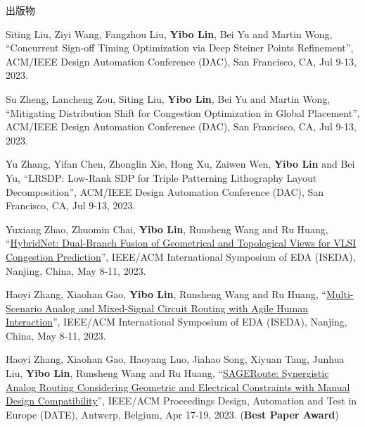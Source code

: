 \begin{rSection}{出版物}
\begin{description}[font=\normalfont, rightmargin=2em]
{}
            

\item[{[C79]}]{
        Siting Liu, Ziyi Wang, Fangzhou Liu, \textbf{Yibo Lin}, Bei Yu and Martin Wong, 
    ``Concurrent Sign-off Timing Optimization via Deep Steiner Points Refinement'', 
    ACM/IEEE Design Automation Conference (DAC), San Francisco, CA, Jul 9-13, 2023.
    
}
            

\item[{[C78]}]{
        Su Zheng, Lancheng Zou, Siting Liu, \textbf{Yibo Lin}, Bei Yu and Martin Wong, 
    ``Mitigating Distribution Shift for Congestion Optimization in Global Placement'', 
    ACM/IEEE Design Automation Conference (DAC), San Francisco, CA, Jul 9-13, 2023.
    
}
            

\item[{[C77]}]{
        Yu Zhang, Yifan Chen, Zhonglin Xie, Hong Xu, Zaiwen Wen, \textbf{Yibo Lin} and Bei Yu, 
    ``LRSDP: Low-Rank SDP for Triple Patterning Lithography Layout Decomposition'', 
    ACM/IEEE Design Automation Conference (DAC), San Francisco, CA, Jul 9-13, 2023.
    
}
            

\item[{[C76]}]{
        Yuxiang Zhao, Zhuomin Chai, \textbf{Yibo Lin}, Runsheng Wang and Ru Huang, 
    ``\href{https://arxiv.org/pdf/2305.05374.pdf}{HybridNet: Dual-Branch Fusion of Geometrical and Topological Views for VLSI Congestion Prediction}'', 
    IEEE/ACM International Symposium of EDA (ISEDA), Nanjing, China, May 8-11, 2023.
    
}
            

\item[{[C75]}]{
        Haoyi Zhang, Xiaohan Gao, \textbf{Yibo Lin}, Runsheng Wang and Ru Huang, 
    ``\href{https://doi.org/10.1109/ISEDA59274.2023.10218434}{Multi-Scenario Analog and Mixed-Signal Circuit Routing with Agile Human Interaction}'', 
    IEEE/ACM International Symposium of EDA (ISEDA), Nanjing, China, May 8-11, 2023.
    
}
            

\item[{[C74]}]{
        Haoyi Zhang, Xiaohan Gao, Haoyang Luo, Jiahao Song, Xiyuan Tang, Junhua Liu, \textbf{Yibo Lin}, Runsheng Wang and Ru Huang, 
    ``\href{https://doi.org/10.23919/DATE56975.2023.10137296}{SAGERoute: Synergistic Analog Routing Considering Geometric and Electrical Constraints with Manual Design Compatibility}'', 
    IEEE/ACM Proceedings Design, Automation and Test in Europe (DATE), Antwerp, Belgium, Apr 17-19, 2023.
    (\textbf{Best Paper Award})
}
            


\end{description}
\end{rSection}
